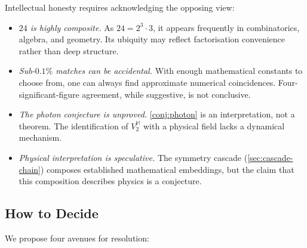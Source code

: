\documentclass[11pt,a4paper]{article}
\theoremstyle{plain}
\theoremstyle{remark}
\begin{document}
Intellectual honesty requires acknowledging the opposing view:

\begin{itemize}[itemsep=4pt]
\item \emph{$24$ is highly composite.}  As $24=2^3\cdot 3$, it appears
  frequently in combinatorics, algebra, and geometry.  Its ubiquity
  may reflect factorisation convenience rather than deep structure.

\item \emph{Sub-$0.1\%$ matches can be accidental.}  With enough
  mathematical constants to choose from, one can always find approximate
  numerical coincidences.  Four-significant-figure agreement, while
  suggestive, is not conclusive.

\item \emph{The photon conjecture is unproved.}  \cref{conj:photon} is
  an interpretation, not a theorem.  The identification of $V_2^{\mathbb{M}}$
  with a physical field lacks a dynamical mechanism.

\item \emph{Physical interpretation is speculative.}  The symmetry cascade
  (\cref{sec:cascade-chain}) composes established mathematical embeddings,
  but the claim that this composition describes physics is a conjecture.
\end{itemize}

\subsection{How to Decide}
\label{sec:disc-decide}

We propose four avenues for resolution:
\end{document}
